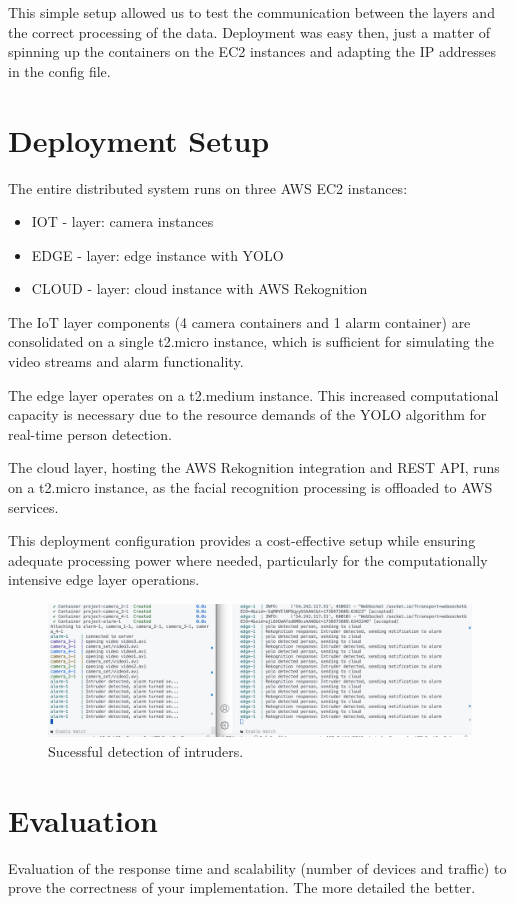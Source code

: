 \documentclass[conference]{IEEEtran}
\begin{document}
This simple setup allowed us to test the communication between the layers and the correct processing of the data. 
Deployment was easy then, just a matter of spinning up the containers on the EC2 instances and adapting the IP addresses in the config file.

\section{Deployment Setup}
The entire distributed system runs on three AWS EC2 instances:
\begin{itemize}
    \item IOT - layer: camera instances
    \item EDGE - layer: edge instance with YOLO
    \item CLOUD - layer: cloud instance with AWS Rekognition
\end{itemize}

\hfill \break

The IoT layer components (4 camera containers and 1 alarm container) are consolidated on a single t2.micro instance, which is sufficient for simulating the video streams and alarm functionality.

The edge layer operates on a t2.medium instance. This increased computational capacity is necessary due to the resource demands of the YOLO algorithm for real-time person detection.

The cloud layer, hosting the AWS Rekognition integration and REST API, runs on a t2.micro instance, as the facial recognition processing is offloaded to AWS services.

This deployment configuration provides a cost-effective setup while ensuring adequate processing power where needed, particularly for the computationally intensive edge layer operations.

\begin{figure}[h!]
    \centering
    \includegraphics[width=1\linewidth]{deployment2.png}
    \caption{Sucessful detection of intruders.}
    \label{fig:deployment}
\end{figure}
\section{Evaluation}
Evaluation of the response time and scalability (number of devices and traffic) to prove the correctness of your implementation. The more detailed the better. 
\end{document}
